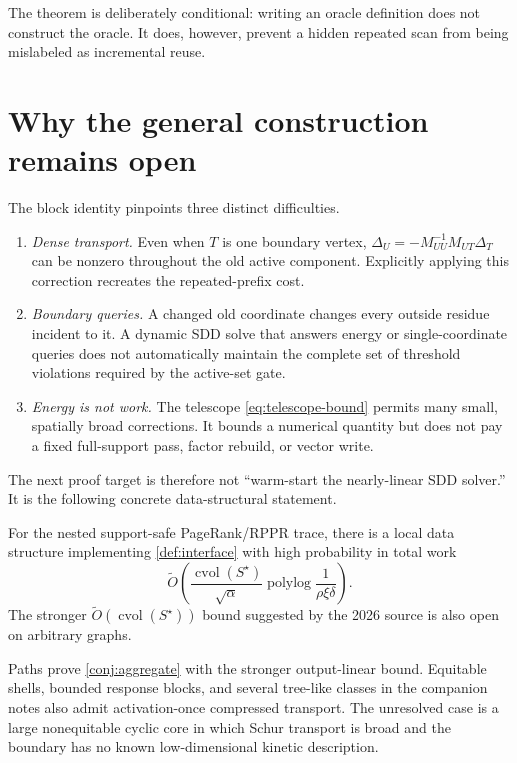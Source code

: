 \documentclass[11pt]{article}
\begin{document}
The theorem is deliberately conditional: writing an oracle definition does
not construct the oracle.  It does, however, prevent a hidden repeated scan
from being mislabeled as incremental reuse.

\section{Why the general construction remains open}
\label{sec:open}

The block identity pinpoints three distinct difficulties.
\begin{enumerate}[label=(\arabic*)]
\item \emph{Dense transport.}  Even when $T$ is one boundary vertex,
$\Delta_U=-M_{UU}^{-1}M_{UT}\Delta_T$ can be nonzero throughout the old
active component.  Explicitly applying this correction recreates the
repeated-prefix cost.
\item \emph{Boundary queries.}  A changed old coordinate changes every
outside residue incident to it.  A dynamic SDD solve that answers energy or
single-coordinate queries does not automatically maintain the complete set
of threshold violations required by the active-set gate.
\item \emph{Energy is not work.}  The telescope
\cref{eq:telescope-bound} permits many small, spatially broad corrections.
It bounds a numerical quantity but does not pay a fixed full-support pass,
factor rebuild, or vector write.
\end{enumerate}

The next proof target is therefore not ``warm-start the nearly-linear SDD
solver.''  It is the following concrete data-structural statement.

\begin{conjecture}
\label{conj:aggregate}
For the nested support-safe PageRank/RPPR trace, there is a local data
structure implementing \cref{def:interface} with high probability in total
work
\begin{equation}
 \widetilde O\!\left(
 \frac{\operatorname{cvol}(S^\star)}{\sqrt\alpha}
 \operatorname{polylog}\frac{1}{\rho\xi\delta}
 \right).
 \label{eq:aggregate-target}
\end{equation}
The stronger $\widetilde O(\operatorname{cvol}(S^\star))$ bound suggested by
the 2026 source is also open on arbitrary graphs.
\end{conjecture}

Paths prove \cref{conj:aggregate} with the stronger output-linear bound.
Equitable shells, bounded response blocks, and several tree-like classes in
the companion notes also admit activation-once compressed transport.  The
unresolved case is a large nonequitable cyclic core in which Schur transport
is broad and the boundary has no known low-dimensional kinetic description.
\end{document}
